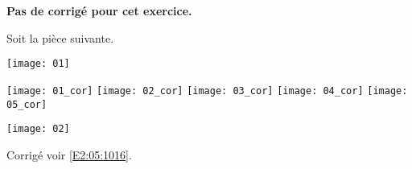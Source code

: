 \normaltrue \difficilefalse \tdifficilefalse
\correctionfalse


\setcounter{question}{0}

\ifcorrection
\else
\textbf{Pas de corrigé pour cet exercice.}
\fi


\ifprof 
\else
Soit la pièce suivante.
\begin{center}
\texttt{[image: 01]}
\end{center}
 \fi
 
\ifprof
\begin{center}
\texttt{[image: 01\_cor]}
\texttt{[image: 02\_cor]}
\texttt{[image: 03\_cor]}
\texttt{[image: 04\_cor]}
\texttt{[image: 05\_cor]}
\end{center}
\else 
\begin{center}
\texttt{[image: 02]}
\end{center}
\fi

\ifprof
\else
\begin{flushright}
\footnotesize{Corrigé  voir \ref{E2:05:1016}.}
\end{flushright}%
\fi